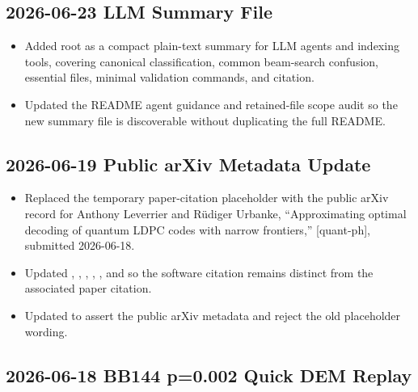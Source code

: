 \subsection*{2026-06-23 LLM Summary File}

\begin{itemize}
\item Added root \texttt{} as a compact plain-text summary for LLM agents and indexing tools, covering canonical classification, common beam-search confusion, essential files, minimal validation commands, and citation.
\item Updated the README agent guidance and retained-file scope audit so the new summary file is discoverable without duplicating the full README.
\end{itemize}

\subsection*{2026-06-19 Public arXiv Metadata Update}

\begin{itemize}
\item Replaced the temporary paper-citation placeholder with the public arXiv record for Anthony Leverrier and Rüdiger Urbanke, ``Approximating optimal decoding of quantum LDPC codes with narrow frontiers,'' \texttt{} [quant-ph], submitted 2026-06-18.
\item Updated \texttt{}, \texttt{}, \texttt{}, \texttt{}, \texttt{}, and \texttt{} so the software citation remains distinct from the associated paper citation.
\item Updated \texttt{} to assert the public arXiv metadata and reject the old placeholder wording.
\end{itemize}

\subsection*{2026-06-18 BB144 p=0.002 Quick DEM Replay}


